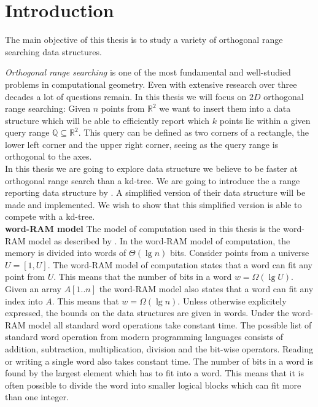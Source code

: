 \chapter{Introduction}
\label{ch:intro}

The main objective of this thesis is to study a variety of orthogonal range searching data structures. 

\emph{Orthogonal range searching} is one of the most fundamental and well-studied problems in computational geometry. Even with extensive research over three decades a lot of questions remain. In this thesis we will focus on $2D$ orthogonal range searching: Given $n$ points from $\mathbb{R}^2$ we want to insert them into a data structure which will be able to efficiently report which $k$ points lie within a given query range $\mathbb{Q} \subseteq \mathbb{R}^2$. This query can be defined as two corners of a rectangle, the lower left corner and the upper right corner, seeing as the query range is orthogonal to the axes. \\

In this thesis we are going to explore data structure we believe to be faster at orthogonal range search than a kd-tree. We are going to introduce the a range reporting data structure by \citet{chanetal}. A simplified version of their data structure will be made and implemented. We wish to show that this simplified version is able to compete with a kd-tree. \\



\noindent \textbf{word-RAM model} The model of computation used in this thesis is the word-RAM model as described by . In the word-RAM model of computation, the memory is divided into words of $\Theta(\lg n)$ bits. Consider points from a universe $U = [1,U]$. The word-RAM model of computation states that a word can fit any point from $U$. This means that the number of bits in a word $w = \Omega(\lg U)$. Given an array $A[1..n]$ the word-RAM model also states that a word can fit any index into $A$. This means that $w = \Omega(\lg n)$. Unless otherwise explicitely expressed, the bounds on the data structures are given in words. Under the word-RAM model all standard word operations take constant time. The possible list of standard word operation from modern programming languages consists of addition, subtraction, multiplication, division and the bit-wise operators. Reading or writing a single word also takes constant time. The number of bits in a word is found by the largest element which has to fit into a word. This means that it is often possible to divide the word into smaller logical blocks which can fit more than one integer.  \\


